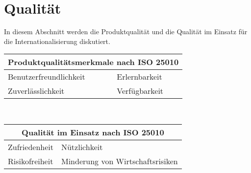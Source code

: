 \section{Qualität}
\label{sec:quality}
In diesem Abschnitt werden die Produktqualität und die Qualität im Einsatz für die Internationalisierung diskutiert.
\newline
\newline
\begin{tabularx}{\textwidth}{ X | X }
	\hline 
	\multicolumn{2}{c}{\vspace{2pt}\textbf{Produktqualitätsmerkmale nach ISO 25010}} \\ \hline
	Benutzerfreundlichkeit    & Erlernbarkeit             \\ 
	Zuverlässlichkeit         & Verfügbarkeit             \\ \hline
\end{tabularx}
\ \newline
\newline
\begin{tabularx}{\textwidth}{ X | X }
	\hline
	\multicolumn{2}{c}{\vspace{2pt}\textbf{Qualität im Einsatz nach ISO 25010}} \\ \hline
	Zufriedenheit         & Nützlichkeit                 \\ 
	Risikofreiheit         & Minderung von Wirtschaftsrisiken                 \\ \hline
\end{tabularx}
\ \newline
